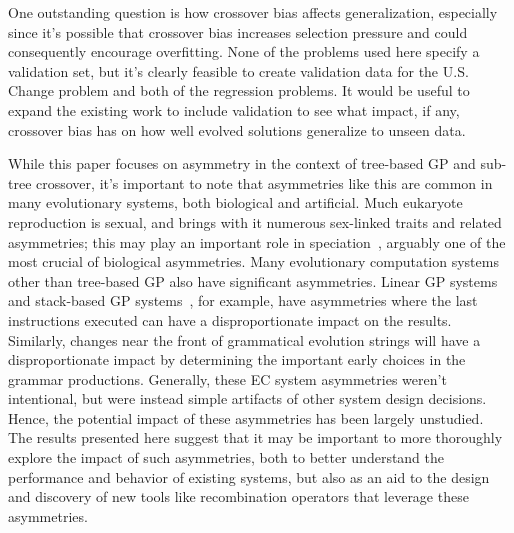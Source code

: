 \documentclass{sig-alternate}
\begin{document}
One outstanding question is how crossover bias affects generalization, especially since it's possible that crossover
bias increases selection pressure and could consequently encourage overfitting. None of the problems used here specify
a validation set, but it's clearly feasible to create validation data for the U.S. Change problem and both of the
regression problems. It would be useful to expand the existing work to include validation to see what impact, if any,
crossover bias has on how well evolved solutions generalize to unseen data.

While this paper focuses on asymmetry in the context of tree-based GP and sub-tree crossover, it's important to note
that asymmetries like this are common in many evolutionary systems, both biological and artificial. Much eukaryote
reproduction is sexual, and brings with it numerous sex-linked traits and related asymmetries; this may play an
important role in speciation~\cite{qvarnstrom2009speciation}, arguably one of the most crucial of biological
asymmetries. Many evolutionary computation systems other than tree-based GP also have significant asymmetries. Linear
GP systems~\cite{brameier2007linear} and stack-based GP systems~\cite{spector:2002:GPEM}, for example, have asymmetries
where the last instructions executed can have a disproportionate impact on the results. Similarly, changes near the
front of grammatical evolution \cite{o2003grammatical} strings will have a disproportionate impact by determining the
important early choices in the grammar productions. Generally, these EC system asymmetries weren't intentional, but
were instead simple artifacts of other system design decisions. Hence, the potential impact of these asymmetries has
been largely unstudied. The results presented here suggest that it may be important to more thoroughly explore the
impact of such asymmetries, both to better understand the performance and behavior of existing systems, but also as an
aid to the design and discovery of new tools like recombination operators that leverage these asymmetries.





\end{document}
